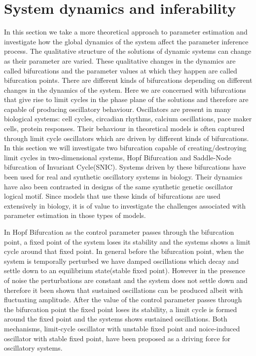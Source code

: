 \documentclass[12pt,a4paper,titlepage]{article}
\begin{document}
\section{System dynamics and inferability}
In this section we take a more theoretical approach to parameter estimation and investigate how the global dynamics of the system affect the parameter inference process. The qualitative structure of the solutions of dynamic systems can change as their parameter are varied. These qualitative changes in the dynamics are called bifurcations and the parameter values at which they happen are called bifurcation points. There are different kinds of bifurcations depending on different changes in the dynamics of the system. Here we are concerned with bifurcations that give rise to limit cycles in the phase plane of the solutions and therefore are capable of producing oscillatory behaviour.  Oscillators are present in many biological systems: cell cycles, circadian rhythms, calcium oscillations, pace maker cells, protein responses. Their behaviour in theoretical models is often captured through limit cycle oscillators which are driven by different kinds of bifurcations. In this section we will investigate two bifurcation capable of creating/destroying limit cycles in two-dimensional systems, Hopf Bifurcation and Saddle-Node bifurcation of Invariant Cycle(SNIC). Systems driven by these bifurcations have been used for real and synthetic oscillatory systems in biology. Their dynamics have also been contrasted in designs of the same synthetic genetic oscillator logical motif\cite{guantes2006dynamical}.  Since models that use these kinds of bifurcations are used extensively in biology, it is of value to investigate the challenges associated with parameter estimation in those types of models.

In Hopf Bifurcation as the control parameter passes through the bifurcation point, a fixed point of the system loses its stability and the systems shows a limit cycle around that fixed point. In general before the bifurcation point, when the system is temporally perturbed we have damped oscillations which decay and settle down to an equilibrium state(stable fixed point). However in the presence of noise the perturbations are constant and the system does not settle down and therefore it been shown that sustained oscillations can be produced albeit with fluctuating amplitude. After the value of the control parameter passes through the bifurcation point the fixed point loses its stability, a limit cycle is formed around the fixed point and the systems shows sustained oscillations.  Both mechanisms, limit-cycle oscillator with unstable fixed point and noice-induced oscillator with stable fixed point, have been proposed as a driving force for oscillatory systems.
\end{document}
